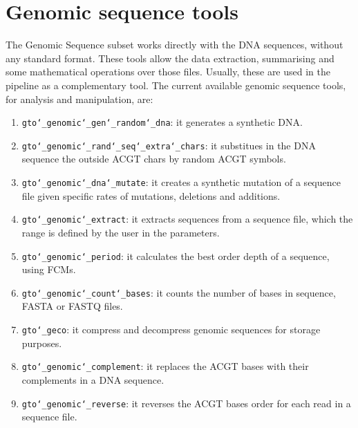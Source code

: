 \chapter{Genomic sequence tools}
\label{gst}
The Genomic Sequence subset works directly with the DNA sequences, without any standard format. These tools allow the data extraction, summarising and some mathematical operations over those files. Usually, these are used in the pipeline as a complementary tool. The current available genomic sequence tools, for analysis and manipulation, are:
\begin{enumerate}

\item \texttt{gto\char`_genomic\char`_gen\char`_random\char`_dna}: it generates a synthetic DNA.

\item \texttt{gto\char`_genomic\char`_rand\char`_seq\char`_extra\char`_chars}: it substitues in the DNA sequence the outside ACGT chars by random ACGT symbols.

\item \texttt{gto\char`_genomic\char`_dna\char`_mutate}: it creates a synthetic mutation of a sequence file given specific rates of mutations, deletions and additions.

\item \texttt{gto\char`_genomic\char`_extract}: it extracts sequences from a sequence file, which the range is defined by the user in the parameters.

\item \texttt{gto\char`_genomic\char`_period}: it calculates the best order depth of a sequence, using FCMs.

\item \texttt{gto\char`_genomic\char`_count\char`_bases}: it counts the number of bases in sequence, FASTA or FASTQ files.

\item \texttt{gto\char`_geco}: it compress and decompress genomic sequences for storage purposes.

\item \texttt{gto\char`_genomic\char`_complement}: it replaces the ACGT bases with their complements in a DNA sequence.

\item \texttt{gto\char`_genomic\char`_reverse}: it reverses the ACGT bases order for each read in a sequence file.

\end{enumerate}










